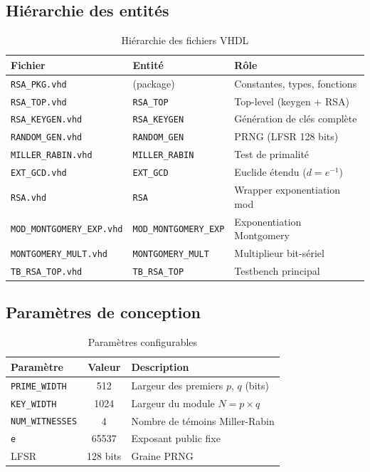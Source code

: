 \documentclass[12pt,a4paper]{report}
\begin{document}
\subsection{Hiérarchie des entités}

\begin{table}[H]
\centering
\caption{Hiérarchie des fichiers VHDL}
\label{tab:hierarchy}
\begin{tabular}{lll}
\toprule
\textbf{Fichier} & \textbf{Entité} & \textbf{Rôle} \\
\midrule
\texttt{RSA\_PKG.vhd}       & (package)           & Constantes, types, fonctions \\
\texttt{RSA\_TOP.vhd}       & \texttt{RSA\_TOP}   & Top-level (keygen + RSA) \\
\texttt{RSA\_KEYGEN.vhd}    & \texttt{RSA\_KEYGEN} & Génération de clés complète \\
\texttt{RANDOM\_GEN.vhd}    & \texttt{RANDOM\_GEN} & PRNG (LFSR 128 bits) \\
\texttt{MILLER\_RABIN.vhd}  & \texttt{MILLER\_RABIN} & Test de primalité \\
\texttt{EXT\_GCD.vhd}       & \texttt{EXT\_GCD}   & Euclide étendu ($d = e^{-1}$) \\
\texttt{RSA.vhd}            & \texttt{RSA}        & Wrapper exponentiation mod \\
\texttt{MOD\_MONTGOMERY\_EXP.vhd} & \texttt{MOD\_MONTGOMERY\_EXP} & Exponentiation Montgomery \\
\texttt{MONTGOMERY\_MULT.vhd} & \texttt{MONTGOMERY\_MULT} & Multiplieur bit-sériel \\
\texttt{TB\_RSA\_TOP.vhd}   & \texttt{TB\_RSA\_TOP} & Testbench principal \\
\bottomrule
\end{tabular}
\end{table}

\subsection{Paramètres de conception}

\begin{table}[H]
\centering
\caption{Paramètres configurables}
\label{tab:params}
\begin{tabular}{lcp{7cm}}
\toprule
\textbf{Paramètre} & \textbf{Valeur} & \textbf{Description} \\
\midrule
\texttt{PRIME\_WIDTH}   & 512   & Largeur des premiers $p$, $q$ (bits) \\
\texttt{KEY\_WIDTH}     & 1024  & Largeur du module $N = p \times q$ \\
\texttt{NUM\_WITNESSES} & 4     & Nombre de témoins Miller-Rabin \\
\texttt{e}              & 65537 & Exposant public fixe \\
LFSR                    & 128 bits & Graine PRNG \\
\bottomrule
\end{tabular}
\end{table}
\end{document}
